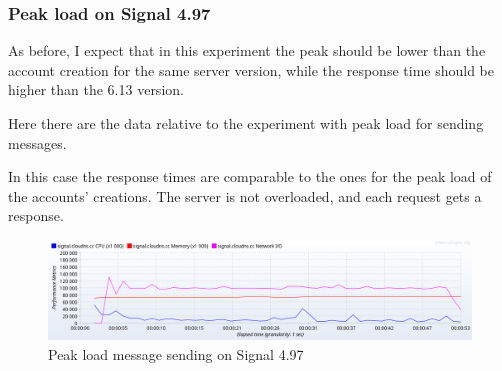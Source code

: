 \subsubsection{Peak load on Signal 4.97}

As before, I expect that in this experiment the peak should be lower than the account creation for the same server version, while the response time should be higher than the 6.13 version.

Here there are the data relative to the experiment with peak load for sending messages.

\begin{table}[H]
\caption{Peak load message sending on Signal 4.97}
\label{tab:peakloadmessage497}
\end{table}

In this case the response times are comparable to the ones for the peak load of the accounts' creations.
The server is not overloaded, and each request gets a response.

\begin{figure}[H]
    \centering
    \includegraphics[width=\textwidth]{images/497/4.97-peak-message}
    \caption{Peak load message sending on Signal 4.97}
    \label{fig:signalmessageloadold}
\end{figure}

